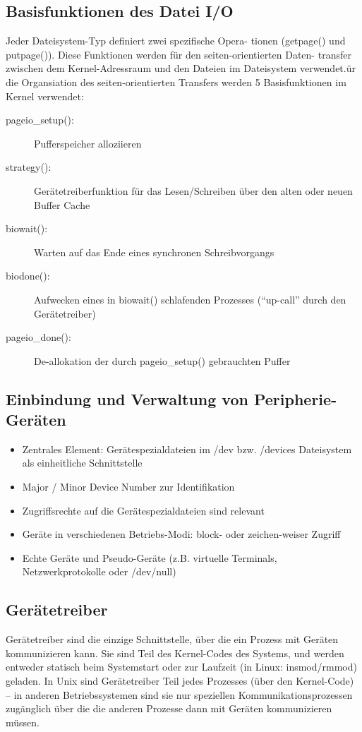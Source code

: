 \documentclass[a4paper, 10pt]{article}
\begin{document}
\subsection{Basisfunktionen des Datei I/O}
Jeder Dateisystem-Typ definiert zwei spezifische Opera- tionen (getpage() und putpage()). Diese Funktionen werden für den seiten-orientierten Daten- transfer zwischen dem Kernel-Adressraum und den Dateien im Dateisystem verwendet.ür die Organsiation des seiten-orientierten Transfers werden 5 Basisfunktionen im Kernel verwendet:
\begin{description}
	\item[pageio\_setup():] Pufferspeicher alloziieren
	\item[strategy():] Gerätetreiberfunktion für das Lesen/Schreiben über den alten oder neuen
Buffer Cache
	\item[biowait():] Warten auf das Ende eines synchronen Schreibvorgangs
	\item[biodone():] Aufwecken eines in biowait() schlafenden Prozesses (“up-call” durch den Gerätetreiber)
	\item[pageio\_done():] De-allokation der durch pageio\_setup() gebrauchten Puffer
\end{description}

\subsection{Einbindung und Verwaltung von Peripherie-Geräten}
\begin{itemize}
	\item Zentrales Element: Gerätespezialdateien im /dev bzw. /devices Dateisystem als einheitliche Schnittstelle
	\item Major / Minor Device Number zur Identifikation
	\item Zugriffsrechte auf die Gerätespezialdateien sind relevant
	\item Geräte in verschiedenen Betriebs-Modi: block- oder zeichen-weiser Zugriff
	\item Echte Geräte und Pseudo-Geräte (z.B. virtuelle Terminals, Netzwerkprotokolle oder /dev/null)
\end{itemize}

\subsection{Gerätetreiber}
Gerätetreiber sind die einzige Schnittstelle, über die ein Prozess mit Geräten kommunizieren kann. Sie sind Teil des Kernel-Codes des Systems, und werden entweder statisch beim Systemstart oder zur Laufzeit (in Linux: insmod/rmmod) geladen. In Unix sind Gerätetreiber Teil jedes Prozesses (über den Kernel-Code) – in anderen Betriebssystemen sind sie nur speziellen Kommunikationsprozessen zugänglich über die die anderen Prozesse dann mit Geräten kommunizieren müssen.
\end{document}
